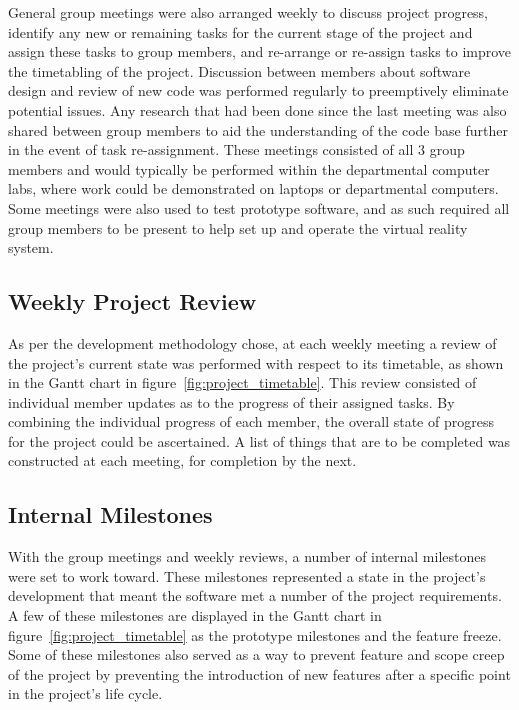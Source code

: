         General group meetings were also arranged weekly to discuss project progress, identify any new or remaining tasks for the current stage of the project and assign these tasks to group members, and re-arrange or re-assign tasks to improve the timetabling of the project. Discussion between members about software design and review of new code was performed regularly to preemptively eliminate potential issues. Any research that had been done since the last meeting was also shared between group members to aid the understanding of the code base further in the event of task re-assignment. These meetings consisted of all 3 group members and would typically be performed within the departmental computer labs, where work could be demonstrated on laptops or departmental computers. Some meetings were also used to test prototype software, and as such required all group members to be present to help set up and operate the virtual reality system.
        
    \subsection{Weekly Project Review}
    
        As per the development methodology chose, at each weekly meeting a review of the project's current state was performed with respect to its timetable, as shown in the Gantt chart in figure~\ref{fig:project_timetable}. This review consisted of individual member updates as to the progress of their assigned tasks. By combining the individual progress of each member, the overall state of progress for the project could be ascertained. A list of things that are to be completed was constructed at each meeting, for completion by the next.
    
    \subsection{Internal Milestones}

        With the group meetings and weekly reviews, a number of internal milestones were set to work toward. These milestones represented a state in the project's development that meant the software met a number of the project requirements. A few of these milestones are displayed in the Gantt chart in figure~\ref{fig:project_timetable} as the prototype milestones and the feature freeze. Some of these milestones also served as a way to prevent feature and scope creep of the project by preventing the introduction of new features after a specific point in the project's life cycle.

